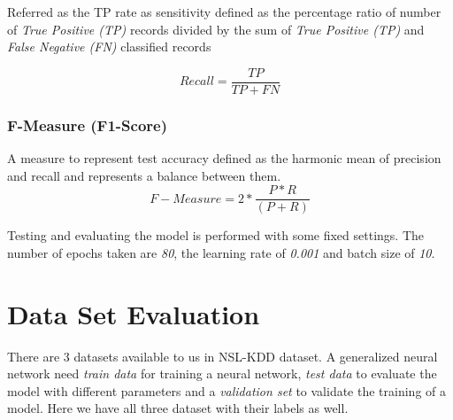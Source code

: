\documentclass[12pt, a4paper]{report}
\begin{document}
Referred as the TP rate as sensitivity defined as the percentage ratio of number of \textit{True Positive (TP)} records divided by the sum of \textit{True Positive (TP)} and \textit{False Negative (FN)} classified records

\begin{equation}
Recall = \frac{TP}{TP+FN}
\end{equation}

\subsubsection{F-Measure (F1-Score)}
A measure to represent test accuracy defined as the harmonic mean of precision and recall and represents a balance between them.
\begin{equation}
F-Measure =	2*\frac{P*R}{(P+R)}
\end{equation}

Testing and evaluating the model is performed with some fixed settings. The number of epochs taken are \textit{80}, the learning rate of \textit{0.001} and batch size of \textit{10}. 
\clearpage
\section {Data Set Evaluation}\label{sec:datasetEvaluation}

There are 3 datasets available to us in NSL-KDD dataset. A generalized neural network need \textit{train data} for training a neural network, \textit{test data} to evaluate the model with different parameters and a \textit{validation set} to validate the training of a model. Here we have all three dataset with their labels as well.\\ \par
\end{document}
